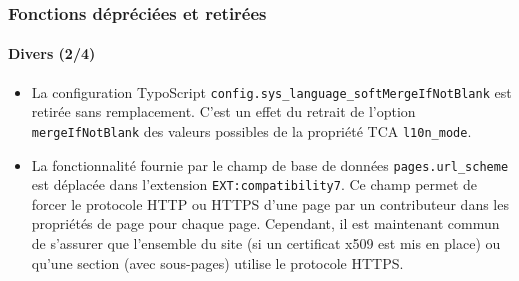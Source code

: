\begin{frame}[fragile]
	\frametitle{Fonctions dépréciées et retirées}
	\framesubtitle{Divers (2/4)}


	\begin{itemize}
		\item La configuration TypoScript \texttt{config.sys\_language\_softMergeIfNotBlank}
			est retirée sans remplacement. C'est un effet du retrait de l'option
			\texttt{mergeIfNotBlank} des valeurs possibles de la propriété TCA
			\texttt{l10n\_mode}.

		\item La fonctionnalité fournie par le champ de base de données \texttt{pages.url\_scheme}
			est déplacée dans l'extension \texttt{EXT:compatibility7}. Ce champ permet de forcer
			le protocole HTTP ou HTTPS d'une page par un contributeur dans les propriétés de page
			pour chaque page. Cependant, il est maintenant commun de s'assurer que l'ensemble
			du site (si un certificat x509 est mis en place) ou qu'une section (avec sous-pages)
			utilise le protocole HTTPS.

	\end{itemize}

\end{frame}



